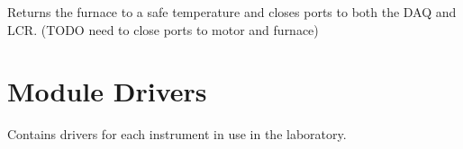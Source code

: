 \documentclass[letterpaper,10pt,english]{sphinxmanual}
\begin{document}
\begin{fulllineitems}
\begin{fulllineitems}
\begin{quote}
\begin{description}
\end{description}\end{quote}

\end{fulllineitems}


\begin{fulllineitems}
\label{\detokenize{laboratory:laboratory.Setup.shut_down}}
Returns the furnace to a safe temperature and closes ports to both the DAQ and LCR. (TODO need to close ports to motor and furnace)

\end{fulllineitems}


\end{fulllineitems}



\chapter{Module Drivers}
\label{\detokenize{drivers:module-drivers}}\label{\detokenize{drivers:module-drivers}}\label{\detokenize{drivers::doc}}
Contains drivers for each instrument in use in the laboratory.
\end{document}
